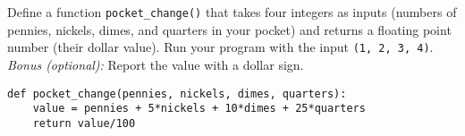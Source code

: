 \documentclass[11pt]{exam}
\begin{document}
\begin{questions}
\begin{comment}
\item Suppose the current price of corn is \$1.20.
The price is set to increase by 10 cents every weekday until it hits \$2.50.
(Nothing happens on weekends.)
At that point it will switch directions and decrease by 10 cents a day.
Finish the code below to print the price of corn every day until it reaches \$2.50.
\begin{verbatim}
days = ["M", "T", "W", "Th", "F"]
starting_price = 1.20
current_price = starting_price
while True:
for day in days:
    current_price = current_price + 0.10
    print("The price on ", day, "is ", current_price)
if current_price == 2.50:
    break
\end{verbatim}
\end{comment}






\item Define a function \verb|pocket_change()| that takes four integers as inputs
(numbers of pennies, nickels, dimes, and quarters in your pocket)
and returns a floating point number (their dollar value).
Run your program with the input {\tt (1, 2, 3, 4)}.
{\it Bonus (optional):} Report the value with a dollar sign.

\begin{solution}
\begin{verbatim}
def pocket_change(pennies, nickels, dimes, quarters):
    value = pennies + 5*nickels + 10*dimes + 25*quarters
    return value/100


\end{verbatim}
\end{solution}
\end{questions}
\end{document}
